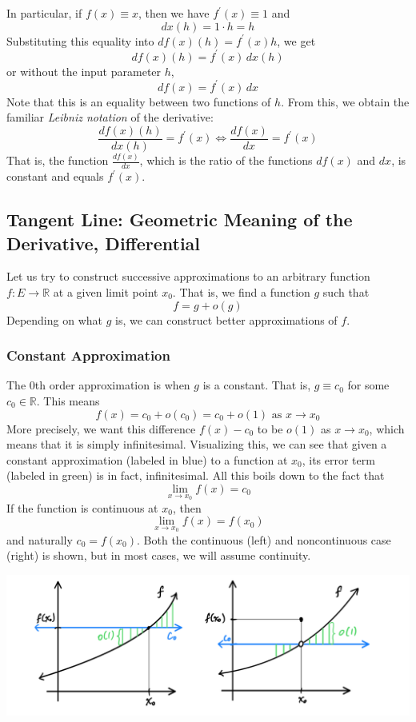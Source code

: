 \documentclass{article}
\theoremstyle{remark}
\theoremstyle{definition}
\begin{document}
In particular, if $f(x) \equiv x$, then we have $f^\prime (x) \equiv 1$ and 
\[dx (h) = 1 \cdot h = h\]
Substituting this equality into $df(x) (h) = f^\prime (x) h$, we get
\[df (x) (h) = f^\prime (x) \,dx (h)\]
or without the input parameter $h$, 
\[df(x) = f^\prime (x) \,dx\]
Note that this is an equality between two functions of $h$. From this, we obtain the familiar \textit{Leibniz notation} of the derivative: 
\[\frac{df (x) (h)}{dx(h)} = f^\prime (x) \iff \frac{df(x)}{dx} = f^\prime (x)\]
That is, the function $\frac{df(x)}{dx}$, which is the ratio of the functions $df(x)$ and $dx$, is constant and equals $f^\prime (x)$. 

\subsection{Tangent Line: Geometric Meaning of the Derivative, Differential}
Let us try to construct successive approximations to an arbitrary function $f: E \longrightarrow \mathbb{R}$ at a given limit point $x_0$. That is, we find a function $g$ such that
\[f = g + o(g)\]
Depending on what $g$ is, we can construct better approximations of $f$. 

\subsubsection{Constant Approximation}
The 0th order approximation is when $g$ is a constant. That is, $g \equiv c_0$ for some $c_0 \in \mathbb{R}$. This means
\[f(x) = c_0 + o(c_0) = c_0 + o(1) \text{ as } x \rightarrow x_0\]
More precisely, we want this difference $f(x) - c_0$ to be $o(1)$ as $x \rightarrow x_0$, which means that it is simply infinitesimal. Visualizing this, we can see that given a constant approximation (labeled in blue) to a function at $x_0$, its error term (labeled in green) is in fact, infinitesimal. All this boils down to the fact that 
\[\lim_{x \rightarrow x_0} f(x) = c_0\]
If the function is continuous at $x_0$, then 
\[\lim_{x \rightarrow x_0} f(x) = f(x_0)\]
and naturally $c_0 = f(x_0)$. Both the continuous (left) and noncontinuous case (right) is shown, but in most cases, we will assume continuity. 
\begin{center}
    \includegraphics[scale=0.3]{img/Constant_Approximation_Continuous_Noncontinuous_case.PNG}
\end{center}
\end{document}
